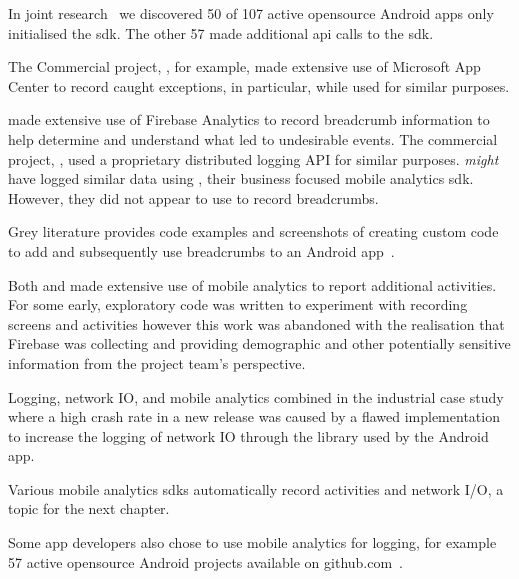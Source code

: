 In joint research~ we discovered 50 of 107 active opensource Android apps only initialised the  \Gls{sdk}. The other 57 made additional \Gls{api} calls to the \Gls{sdk}.

The Commercial project, , for example, made extensive use of Microsoft App Center to record caught exceptions, in particular, while  used  for similar purposes. 

 made extensive use of Firebase Analytics to record breadcrumb information to help determine and understand what led to undesirable events.  The commercial project, , used a proprietary distributed logging API for similar purposes.  \emph{might} have logged similar data using , their business focused mobile analytics \Gls{sdk}. However, they did not appear to use  to record breadcrumbs. 

Grey literature provides code examples and screenshots of creating custom code to add and subsequently use breadcrumbs to an Android app~. 

Both  and  made extensive use of mobile analytics to report additional activities. For  some early, exploratory code was written to experiment with recording screens and activities however this work was abandoned with the realisation that Firebase was collecting and providing demographic and other potentially sensitive information from the project team's perspective. 

Logging, network IO, and mobile analytics combined in the industrial case study where a high crash rate in a new release was caused by a flawed implementation to increase the logging of network IO through the  library used by the Android app. 

Various mobile analytics \Glspl{sdk} automatically record activities and network I/O, a topic for the next chapter. 

Some app developers also chose to use mobile analytics for logging, for example 57 active opensource Android projects available on github.com~.

